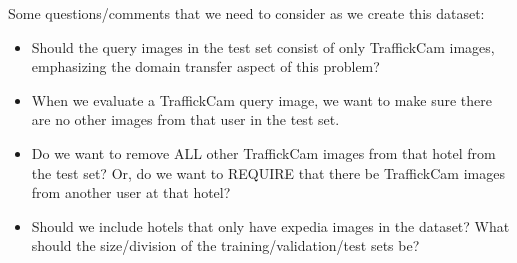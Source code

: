 \documentclass[letterpaper]{article} %
\begin{document}
Some questions/comments that we need to consider as we create this dataset:
\begin{itemize}
\item Should the query images in the test set consist of only TraffickCam images, emphasizing the domain transfer aspect of this problem?
\item When we evaluate a TraffickCam query image, we want to make sure there are no other images from that user in the test set.
\item Do we want to remove ALL other TraffickCam images from that hotel from the test set? Or, do we want to REQUIRE that there be TraffickCam images from another user at that hotel?
\item Should we include hotels that only have expedia images in the dataset?
What should the size/division of the training/validation/test sets be?
\end{itemize}




\end{document}
